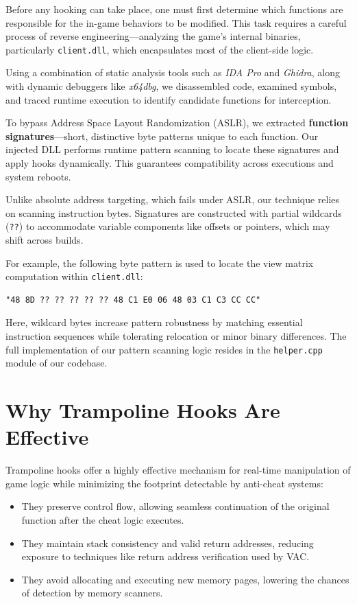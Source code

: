Before any hooking can take place, one must first determine which functions are responsible for the in-game behaviors to be modified.  
This task requires a careful process of reverse engineering—analyzing the game's internal binaries, particularly \texttt{client.dll}, which encapsulates most of the client-side logic.

Using a combination of static analysis tools such as \textit{IDA Pro} and \textit{Ghidra}, along with dynamic debuggers like \textit{x64dbg}, we disassembled code, examined symbols, and traced runtime execution to identify candidate functions for interception.

To bypass Address Space Layout Randomization (ASLR), we extracted \textbf{function signatures}—short, distinctive byte patterns unique to each function.  
Our injected DLL performs runtime pattern scanning to locate these signatures and apply hooks dynamically. This guarantees compatibility across executions and system reboots.

Unlike absolute address targeting, which fails under ASLR, our technique relies on scanning instruction bytes.  
Signatures are constructed with partial wildcards (\texttt{??}) to accommodate variable components like offsets or pointers, which may shift across builds.

For example, the following byte pattern is used to locate the view matrix computation within \texttt{client.dll}:

\begin{lstlisting}[style=cppstyle]
"48 8D ?? ?? ?? ?? ?? 48 C1 E0 06 48 03 C1 C3 CC CC"
\end{lstlisting}

Here, wildcard bytes increase pattern robustness by matching essential instruction sequences while tolerating relocation or minor binary differences.  
The full implementation of our pattern scanning logic resides in the \texttt{helper.cpp} module of our codebase.

\section{Why Trampoline Hooks Are Effective}

Trampoline hooks offer a highly effective mechanism for real-time manipulation of game logic while minimizing the footprint detectable by anti-cheat systems:

\begin{itemize}
  \item They preserve control flow, allowing seamless continuation of the original function after the cheat logic executes.
  \item They maintain stack consistency and valid return addresses, reducing exposure to techniques like return address verification used by VAC.
  \item They avoid allocating and executing new memory pages, lowering the chances of detection by memory scanners.
\end{itemize}

